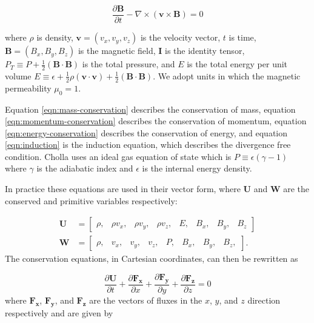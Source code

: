 \documentclass[modern]{aastex631}
\begin{document}
\begin{equation}
    \label{eqn:induction}
    \frac{\partial \boldsymbol{B}}{\partial t} - \nabla \times (\boldsymbol{v} \times \boldsymbol{B}) = 0
\end{equation}

\noindent where $\rho$ is density, $\boldsymbol{v} = ( v_x, v_y, v_z)$ is the velocity vector, $t$ is time, $\boldsymbol{B} = ( B_x, B_y, B_z)$ is the magnetic field, $\boldsymbol{I}$ is the identity tensor, $P_T \equiv P + \frac{1}{2}(\boldsymbol{B} \cdot \boldsymbol{B})$ is the total pressure, and $E$ is the total energy per unit volume $E \equiv \epsilon + \frac{1}{2}\rho(\boldsymbol{v}\cdot\boldsymbol{v}) + \frac{1}{2}(\boldsymbol{B}\cdot\boldsymbol{B})$. We adopt units in which the magnetic permeability $\mu_0 = 1$.

Equation \ref{eqn:mass-conservation} describes the conservation of mass, equation \ref{eqn:momentum-conservation} describes the conservation of momentum, equation \ref{eqn:energy-conservation} describes the conservation of energy, and equation \ref{eqn:induction} is the induction equation, which describes the divergence free condition. Cholla uses an ideal gas equation of state  which is $P \equiv \epsilon(\gamma - 1)$ where $\gamma$ is the adiabatic index and $\epsilon$ is the internal energy density.

In practice these equations are used in their vector form, where $\boldsymbol{U}$ and $\boldsymbol{W}$ are the conserved and primitive variables respectively:

\begin{align}
    \boldsymbol{U} &= \begin{bmatrix}
            \rho , &
            \rho v_x, &
            \rho v_y, &
            \rho v_z, &
            E,   &
            B_x, &
            B_y, &
            B_z
         \end{bmatrix}
    \\
    \boldsymbol{W} &= \begin{bmatrix}
            \rho, &
            v_x, &
            v_y, &
            v_z, &
            P,   &
            B_x, &
            B_y, &
            B_z,
         \end{bmatrix}.
\end{align}
The conservation equations, in Cartesian coordinates, can then be rewritten as

\begin{equation}
    \label{eqn:vector-conserved}
    \frac{\partial \boldsymbol{U}}{\partial t} +
    \frac{\partial \boldsymbol{F_x}}{\partial x} +
    \frac{\partial \boldsymbol{F_y}}{\partial y} +
    \frac{\partial \boldsymbol{F_z}}{\partial z} = 0
\end{equation}
where $\boldsymbol{F_x}$, $\boldsymbol{F_y}$, and $\boldsymbol{F_z}$ are the vectors of fluxes in the $x$, $y$, and $z$ direction respectively and are given by
\end{document}
